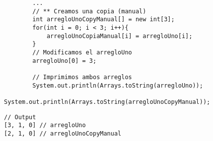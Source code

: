 \documentclass[11pt, oneside]{article}
\begin{document}
\begin{figure}[H]
\centering
\begin{verbatim}
		...
		// ** Creamos una copia (manual)
		int arregloUnoCopyManual[] = new int[3];
		for(int i = 0; i < 3; i++){
			arregloUnoCopiaManual[i] = arregloUno[i];
		}
		// Modificamos el arregloUno
		arregloUno[0] = 3;

		// Imprimimos ambos arreglos
		System.out.println(Arrays.toString(arregloUno));
		System.out.println(Arrays.toString(arregloUnoCopyManual));
\end{verbatim}
\begin{verbatim}
// Output
[3, 1, 0] // arregloUno
[2, 1, 0] // arregloUnoCopyManual
\end{verbatim}
\end{figure}
\end{document}
